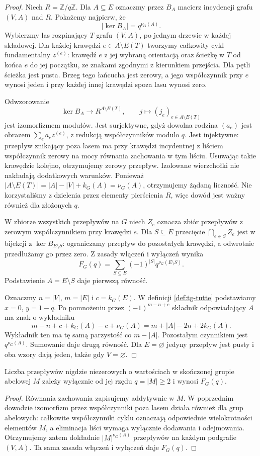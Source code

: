 \begin{proof}
Niech $R=\mathbb Z/q\mathbb Z$.
Dla $A\subseteq E$ oznaczmy przez $B_A$
macierz incydencji grafu $(V,A)$ nad $R$.
Pokażemy najpierw, że
\[
|\ker B_A|=q^{\nu_G(A)}.
\]
Wybierzmy las rozpinający $T$ grafu $(V,A)$,
po jednym drzewie w każdej składowej.
Dla każdej krawędzi $e\in A\setminus E(T)$
tworzymy całkowity cykl fundamentalny $z^{(e)}$:
krawędź $e$ z jej wybraną orientacją oraz ścieżkę
w $T$ od końca $e$ do jej początku, ze znakami
zgodnymi z kierunkiem przejścia.
Dla pętli ścieżka jest pusta.
Brzeg tego łańcucha jest zerowy, a jego współczynnik
przy $e$ wynosi jeden i przy każdej innej krawędzi
spoza lasu wynosi zero.

Odwzorowanie
\[
\ker B_A\longrightarrow R^{A\setminus E(T)},\qquad
j\longmapsto (j_e)_{e\in A\setminus E(T)}
\]
jest izomorfizmem modułów. Jest surjektywne,
gdyż dowolna rodzina $(a_e)$ jest obrazem
$\sum_e a_e z^{(e)}$, z redukcją współczynników modulo $q$.
Jest injektywne: przepływ znikający poza lasem
ma przy krawędzi incydentnej z liściem współczynnik
zerowy na mocy równania zachowania w tym liściu.
Usuwając takie krawędzie kolejno, otrzymujemy
zerowy przepływ. Izolowane wierzchołki nie nakładają
dodatkowych warunków.
Ponieważ $|A\setminus E(T)|=|A|-|V|+k_G(A)=\nu_G(A)$,
otrzymujemy żądaną liczność. Nie korzystaliśmy
z dzielenia przez elementy pierścienia $R$, więc
dowód jest ważny również dla złożonych $q$.

W zbiorze wszystkich przepływów na $G$ niech $Z_e$
oznacza zbiór przepływów z zerowym współczynnikiem
przy krawędzi $e$. Dla $S\subseteq E$ przecięcie
$\bigcap_{e\in S}Z_e$ jest w bijekcji z $\ker B_{E\setminus S}$:
ograniczamy przepływ do pozostałych krawędzi,
a odwrotnie przedłużamy go przez zero.
Z zasady włączeń i wyłączeń wynika
\[
F_G(q)=\sum_{S\subseteq E}(-1)^{|S|}
q^{\nu_G(E\setminus S)}.
\]
Podstawienie $A=E\setminus S$ daje pierwszą równość.

Oznaczmy $n=|V|$, $m=|E|$ i $c=k_G(E)$.
W definicji \ref{def:tg-tutte} podstawiamy $x=0$,
$y=1-q$. Po pomnożeniu przez $(-1)^{m-n+c}$
składnik odpowiadający $A$ ma znak o wykładniku
\[
m-n+c+k_G(A)-c+\nu_G(A)
=m+|A|-2n+2k_G(A).
\]
Wykładnik ten ma tę samą parzystość co $m-|A|$.
Pozostałym czynnikiem jest $q^{\nu_G(A)}$.
Sumowanie daje drugą równość.
Dla $E=\varnothing$ jedyny przepływ jest pusty
i oba wzory dają jeden, także gdy $V=\varnothing$.
\end{proof}

\begin{wniosek}
Liczba przepływów nigdzie niezerowych o wartościach
w skończonej grupie abelowej $M$ zależy wyłącznie
od jej rzędu $q=|M|\ge2$ i wynosi $F_G(q)$.
\end{wniosek}
\begin{proof}
Równania zachowania zapisujemy addytywnie w $M$.
W poprzednim dowodzie izomorfizm przez współczynniki
poza lasem działa również dla grup abelowych:
całkowite współczynniki cyklu oznaczają odpowiednie
wielokrotności elementów $M$, a eliminacja liści
wymaga wyłącznie dodawania i odejmowania.
Otrzymujemy zatem dokładnie $|M|^{\nu_G(A)}$
przepływów na każdym podgrafie $(V,A)$.
Ta sama zasada włączeń i wyłączeń daje $F_G(q)$.
\end{proof}

